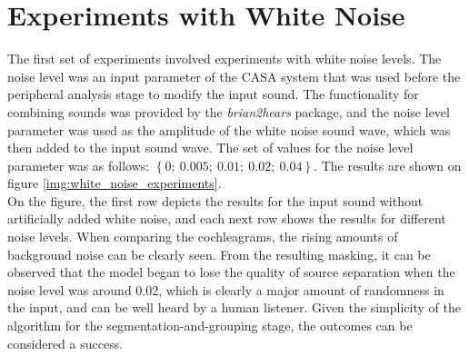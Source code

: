 \section{Experiments with White Noise}

The first set of experiments involved experiments with white noise levels. The noise level was an input parameter of the CASA system that was used before the peripheral analysis stage to modify the input sound. The functionality for combining sounds was provided by the \textit{brian2hears} \cite{Stimberg2019brian2hears} package, and the noise level parameter was used as the amplitude of the white noise sound wave, which was then added to the input sound wave. The set of values for the noise level parameter was as follows: $\left\{0;~0.005;~0.01;~0.02;~0.04\right\}$. The results are shown on figure \ref{img:white_noise_experiments}.\\

On the figure, the first row depicts the results for the input sound without artificially added white noise, and each next row shows the results for different noise levels. When comparing the cochleagrams, the rising amounts of background noise can be clearly seen. From the resulting masking, it can be observed that the model began to lose the quality of source separation when the noise level was around $0.02$, which is clearly a major amount of randomness in the input, and can be well heard by a human listener. Given the simplicity of the algorithm for the segmentation-and-grouping stage, the outcomes can be considered a success.

